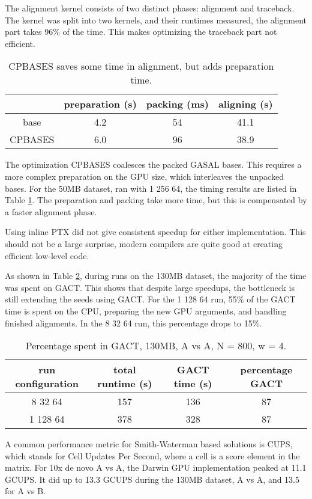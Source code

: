 \documentclass[../thesis.tex]{subfiles}
\begin{document}
The alignment kernel consists of two distinct phases: alignment and traceback.
The kernel was split into two kernels, and their runtimes measured, the alignment part takes 96\% of the time.
This makes optimizing the traceback part not efficient.

\begin{table}
\centering
\caption{CPBASES saves some time in alignment, but adds preparation time.}
\label{tbl:CPBASES}
\begin{tabular}{c c c c}
& preparation (s) & packing (ms) & aligning (s) \\ \hline
base & 4.2 & 54 & 41.1 \\
CPBASES & 6.0 & 96 & 38.9 \\
\end{tabular}
\end{table}

The optimization CPBASES coalesces the packed GASAL bases.
This requires a more complex preparation on the GPU size, which interleaves the unpacked bases.
For the 50MB dataset, ran with 1 256 64, the timing results are listed in Table \ref{tbl:CPBASES}.
The preparation and packing take more time, but this is compensated by a faster alignment phase.

Using inline PTX did not give consistent speedup for either implementation.
This should not be a large surprise, modern compilers are quite good at creating efficient low-level code.

As shown in Table \ref{tbl:darwin7}, during runs on the 130MB dataset, the majority of the time was spent on GACT.
This shows that despite large speedups, the bottleneck is still extending the seeds using GACT.
For the 1 128 64 run, 55\% of the GACT time is spent on the CPU, preparing the new GPU arguments, and handling finished alignments.
In the 8 32 64 run, this percentage drops to 15\%.
\begin{table}
\centering
\caption{Percentage spent in GACT, 130MB, A vs A, N = 800, w = 4.}
\label{tbl:darwin7}
\begin{tabular}{c|c c c}
run configuration & total runtime (s) & GACT time (s) & percentage GACT \\ \hline
8 32 64 & 157 & 136 & 87 \\
1 128 64 & 378 & 328 & 87 \\
\end{tabular}
\end{table}



A common performance metric for Smith-Waterman based solutions is CUPS, which stands for Cell Updates Per Second, where a cell is a score element in the matrix.
For 10x de novo A vs A, the Darwin GPU implementation peaked at 11.1 GCUPS.
It did up to 13.3 GCUPS during the 130MB dataset, A vs A, and 13.5 for A vs B.
\end{document}
